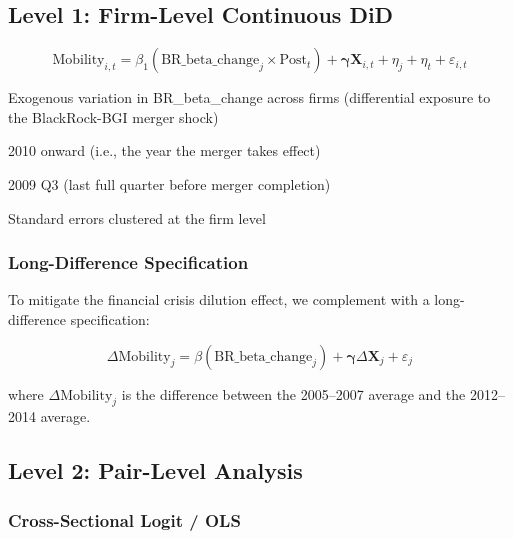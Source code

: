 \documentclass[11pt,a4paper]{article}
\begin{document}
\subsection{Level 1: Firm-Level Continuous DiD}

\begin{equation}\label{eq:firm_did}
\text{Mobility}_{i,t} = \beta_1 (\text{BR\_beta\_change}_j \times \text{Post}_t) + \boldsymbol{\gamma} \mathbf{X}_{i,t} + \eta_j + \eta_t + \varepsilon_{i,t}
\end{equation}

\begin{description}[leftmargin=*]
  \item[Source of identification] Exogenous variation in BR\_beta\_change across firms (differential exposure to the BlackRock-BGI merger shock)
  \item[Post definition] 2010 onward (i.e., the year the merger takes effect)
  \item[Base period] 2009 Q3 (last full quarter before merger completion)
  \item[Clustering] Standard errors clustered at the firm level
\end{description}

\subsubsection*{Long-Difference Specification}

To mitigate the financial crisis dilution effect, we complement with a long-difference specification:

\begin{equation}
\Delta \text{Mobility}_{j} = \beta (\text{BR\_beta\_change}_j) + \boldsymbol{\gamma} \Delta \mathbf{X}_{j} + \varepsilon_{j}
\end{equation}

where \(\Delta \text{Mobility}_j\) is the difference between the 2005--2007 average and the 2012--2014 average.

\newpage

\subsection{Level 2: Pair-Level Analysis}

\subsubsection*{Cross-Sectional Logit / OLS}
\end{document}
